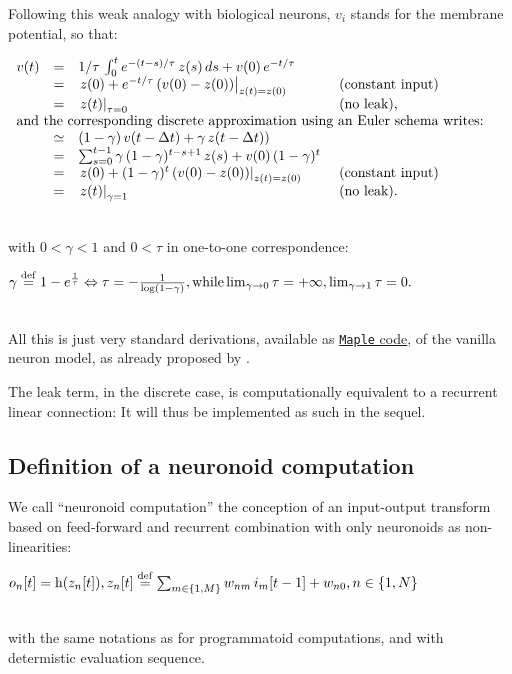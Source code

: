 \documentclass[a4]{article} \usepackage[left=2cm,right=3cm,top=1cm,bottom=2cm]{geometry}
\newcommand{\eqline}[1]{~\vspace{0.1cm}\\\centerline{$#1$}\vspace{0.1cm}\\}
\newcommand{\defq}{\stackrel {\rm def}{=}}
\begin{document}
Following this weak analogy with biological neurons, $v_i$ stands for the membrane potential, so that:
\eqline{\begin{array}{rcll} v(t)
  &=& 1/\tau \, \int_0^t e^{-(t-s)/\tau} \, z(s) \, ds + v(0) \, e^{-t/\tau} \\
  &=& \left. z(0) + e^{-t/\tau} \, (v(0) - z(0)) \right|_{z(t)= z(0)} & \mbox{ (constant input)}\\
   &=& \left. z(t) \right|_{\tau = 0} & \mbox{ (no leak),}\\
  \multicolumn{4}{l}{\mbox{and the corresponding discrete approximation using an Euler schema writes:}} \\
  &\simeq&  (1-\gamma) \, v(t-\Delta t) + \gamma \, z(t-\Delta t)) \\
  &=& \sum_{s=0}^{t-1} \gamma \, (1-\gamma)^{t-s+1} \, z(s) + v(0) \, (1-\gamma)^t \\
  &=& \left. z(0) + (1-\gamma)^t \, (v(0) - z(0)) \right|_{z(t)= z(0)} & \mbox{ (constant input)}\\
  &=& \left. z(t) \right|_{\gamma = 1} & \mbox{ (no leak)}. \\
\end{array}} 
with $0 < \gamma < 1$ and $0 < \tau$ in one-to-one correspondence:
\eqline{\gamma \defq 1 - e^{\frac{1}{\tau}} \Leftrightarrow \tau = -\frac{1}{\log\left(1-\gamma\right)},  \mbox{while} \lim_{\gamma \rightarrow 0} \tau = +\infty , \lim_{\gamma \rightarrow 1} \tau = 0.}

All this is just very standard derivations, available as \href{https://raw.githubusercontent.com/vthierry/braincraft/master/doc/tex/neuronoid.mpl.out.txt}{{\tt Maple} code}, of the vanilla neuron model, as already proposed by \cite{lapicque_recherches_1907}.

The leak term, in the discrete case, is computationally equivalent to a recurrent linear connection: It will thus be implemented as such in the sequel.

\subsection{Definition of a neuronoid computation}

We call ``neuronoid computation'' the conception of an input-output transform based on feed-forward and recurrent combination with only neuronoids as non-linearities:
\eqline{o_n[t] = \mbox{h}(z_n[t]), z_n[t] \defq \sum_{m\in\{1,M\}} w_{nm} \, i_m[t-1] + w_{n0}, n \in \{1, N\}}
with the same notations as for programmatoid computations, and with determistic evaluation sequence.
\end{document}
